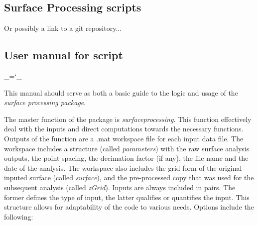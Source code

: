 \documentclass[12pt,a4paper]{article}
\begin{document}
\subsection{Surface Processing scripts}

Or possibly a link to a git repository...

\subsection{User manual for script}

\chardef\_=`_

This manual should serve as both a basic guide to the logic and usage of the \textit{surface processing package}. 

The master function of the package is \textit{surfaceprocessing}. This function effectively deal with the inputs and direct computations towards the necessary functions. Outputs of the function are a .mat workspace file for each input data file. The workspace includes a structure (called \textit{parameters}) with the raw surface analysis outputs, the point spacing, the decimation factor (if any), the file name and the date of the analysis. The workspace also includes the grid form of the original inputed surface (called \textit{surface}), and the pre-processed copy that was used for the subsequent analysis (called \textit{zGrid}).  Inputs are always included in pairs. The former defines the type of input, the latter qualifies or quantifies the input. This structure allows for adaptability of the code to various needs. Options include the following:
\end{document}
